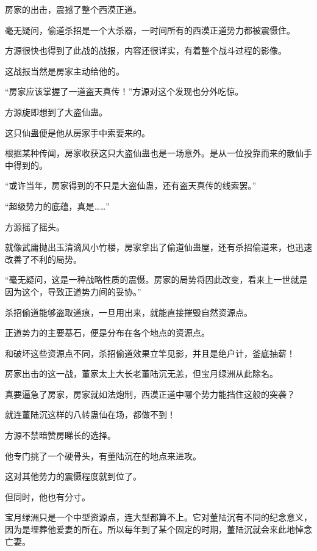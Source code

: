 
\begin{this_body}



房家的出击，震撼了整个西漠正道。

毫无疑问，偷道杀招是一个大杀器，一时间所有的西漠正道势力都被震慑住。

方源很快也得到了此战的战报，内容还很详实，有着整个战斗过程的影像。

这战报当然是房家主动给他的。

“房家应该掌握了一道盗天真传！”方源对这个发现也分外吃惊。

方源旋即想到了大盗仙蛊。

这只仙蛊便是他从房家手中索要来的。

根据某种传闻，房家收获这只大盗仙蛊也是一场意外。是从一位投靠而来的散仙手中得到的。

“或许当年，房家得到的不只是大盗仙蛊，还有盗天真传的线索罢。”

“超级势力的底蕴，真是……”

方源摇了摇头。

就像武庸抛出玉清滴风小竹楼，房家拿出了偷道仙蛊屋，还有杀招偷道来，也迅速改善了不利的局势。

“毫无疑问，这是一种战略性质的震慑。房家的局势将因此改变，看来上一世就是因为这个，导致正道势力间的妥协。”

杀招偷道能够盗取道痕，一旦用出来，就能直接摧毁自然资源点。

正道势力的主要基石，便是分布在各个地点的资源点。

和破坏这些资源点不同，杀招偷道效果立竿见影，并且是绝户计，釜底抽薪！

房家出击的这一战，董家太上大长老董陆沉无恙，但宝月绿洲从此除名。

真要逼急了房家，房家就如法炮制，西漠正道中哪个势力能挡住这般的突袭？

就连董陆沉这样的八转蛊仙在场，都做不到！

方源不禁暗赞房睇长的选择。

他专门挑了一个硬骨头，有董陆沉在的地点来进攻。

这对其他势力的震慑程度就到位了。

但同时，他也有分寸。

宝月绿洲只是一个中型资源点，连大型都算不上。它对董陆沉有不同的纪念意义，因为是埋葬他爱妻的所在。所以每年到了某个固定的时期，董陆沉就会来此地悼念亡妻。


\end{this_body}
